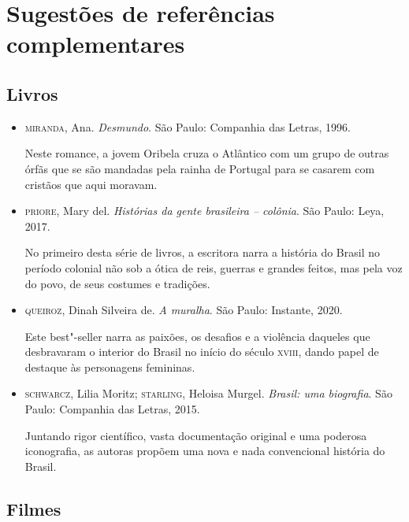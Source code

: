 \documentclass[12pt]{extarticle}
\begin{document}
\section{Sugestões de referências complementares}\label{sugestoes}

\subsection{Livros}

\begin{itemize}
\item\textsc{miranda}, Ana. \textit{Desmundo}. São Paulo: Companhia das Letras, 1996.

Neste romance, a jovem Oribela cruza o Atlântico com um grupo de outras
órfãs que se são mandadas pela rainha de Portugal para se casarem com
cristãos que aqui moravam.

\item\textsc{priore}, Mary del. \textit{Histórias da gente brasileira -- colônia}. São Paulo: Leya, 2017.

No primeiro desta série de livros, a escritora narra a história do
Brasil no período colonial não sob a ótica de reis, guerras e grandes
feitos, mas pela voz do povo, de seus costumes e tradições.

\item\textsc{queiroz}, Dinah Silveira de. \textit{A muralha}. São Paulo: Instante,
2020.

Este best"-seller narra as paixões, os desafios e a violência daqueles
que desbravaram o interior do Brasil no início do século \textsc{xviii}, dando
papel de destaque às personagens femininas.

\item\textsc{schwarcz}, Lilia Moritz; \textsc{starling}, Heloisa Murgel. \textit{Brasil: uma biografia}. São Paulo: Companhia das Letras, 2015.

Juntando rigor científico, vasta documentação original e uma poderosa
iconografia, as autoras propõem uma nova e nada convencional história do
Brasil.
\end{itemize}

\subsection{Filmes}
\end{document}

